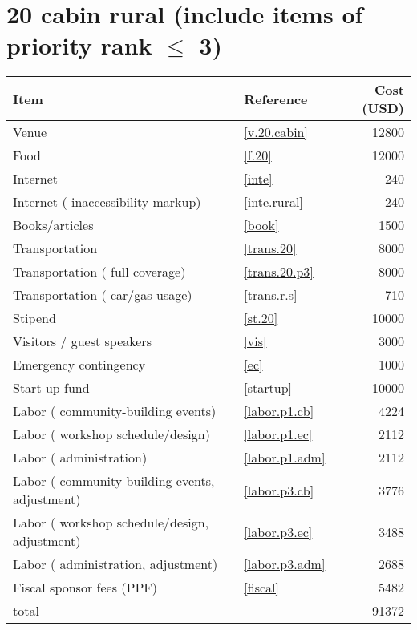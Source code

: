 \section*{20 cabin rural (include items of priority rank $\leq$ 3)}
\begin{center}
\begin{tabular}{llr}
Item & Reference & Cost (USD) \\ \hline
Venue & \ref{v.20.cabin} & 12800 \\
Food & \ref{f.20} & 12000 \\
Internet & \ref{inte} & 240 \\
Internet ( inaccessibility markup) & \ref{inte.rural} & 240 \\
Books/articles & \ref{book} & 1500 \\
Transportation & \ref{trans.20} & 8000 \\
Transportation ( full coverage) & \ref{trans.20.p3} & 8000 \\
Transportation ( car/gas usage) & \ref{trans.r.s} & 710 \\
Stipend & \ref{st.20} & 10000 \\
Visitors / guest speakers & \ref{vis} & 3000 \\
Emergency contingency & \ref{ec} & 1000 \\
Start-up fund & \ref{startup} & 10000 \\
Labor ( community-building events) & \ref{labor.p1.cb} & 4224 \\
Labor ( workshop schedule/design) & \ref{labor.p1.ec} & 2112 \\
Labor ( administration) & \ref{labor.p1.adm} & 2112 \\
Labor ( community-building events, adjustment) & \ref{labor.p3.cb} & 3776 \\
Labor ( workshop schedule/design, adjustment) & \ref{labor.p3.ec} & 3488 \\
Labor ( administration, adjustment) & \ref{labor.p3.adm} & 2688 \\
Fiscal sponsor fees (PPF) & \ref{fiscal} & 5482 \\ \hline
total &  & 91372
\end{tabular}
\end{center}
\newpage
